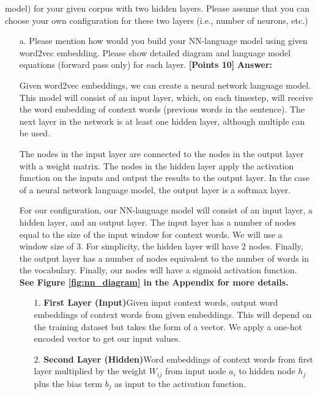 \documentclass[12pt]{article}
\newcommand\tab[1][1cm]{\hspace*{#1}}
\newcommand\n{\newline}
\begin{document}
\begin{enumerate}
          model) for your given corpus with two hidden layers. Please assume
          that you can choose your own configuration for these two layers (i.e.,
          number of neurons, etc.)
          \begin{enumerate}
              \item[a.] Please mention how would you build your NN-language
                  model using given word2vec embedding. Please show detailed
                  diagram and language model equations (forward pass only) for
                  each layer.
                  \textbf{[Points 10]}\n
                  \textbf{Answer:}

                  \tab Given word2vec embeddings, we can create a neural network
                  language model. This model will consist of an input layer,
                  which, on each timestep, will receive the word embedding of
                  context words (previous words in the sentence). The next layer
                  in the network is at least one hidden layer, although multiple
                  can be used.

                  The nodes in the input layer are connected to the
                  nodes in the output layer with a weight matrix. The nodes in
                  the hidden layer apply the activation function on the inputs
                  and output the results to the output layer. In the case of a
                  neural network language model, the output layer is a softmax
                  layer.

                  For our configuration, our NN-language model will consist of
                  an input layer, a hidden layer, and an output layer. The input
                  layer has a number of nodes equal to the size of the input
                  window for context words. We will use a window size of $3$.
                  For simplicity, the hidden layer will have $2$ nodes. Finally,
                  the output layer has a number of nodes equivalent to the
                  number of words in the vocabulary. Finally, our nodes will
                  have a sigmoid activation function. \textbf{See Figure
                      \ref{fig:nn_diagram} in the Appendix for more details.}

                  \begin{enumerate}
                      \item[1.] \textbf{First Layer (Input)}\n Given input
                          context words, output word embeddings of context words
                          from given embeddings. This will depend on the
                          training dataset but takes the form of a vector. We
                          apply a one-hot encoded vector to get our input
                          values.
                      \item[2.] \textbf{Second Layer (Hidden)}\n Word embeddings
                          of context words from first layer multiplied by the
                          weight $W_{ij}$ from input node $a_i$ to hidden node
                          $h_j$ plus the bias term $b_j$ as input to the
                          activation function.


\end{enumerate}
\end{enumerate}
\end{enumerate}
\end{document}
